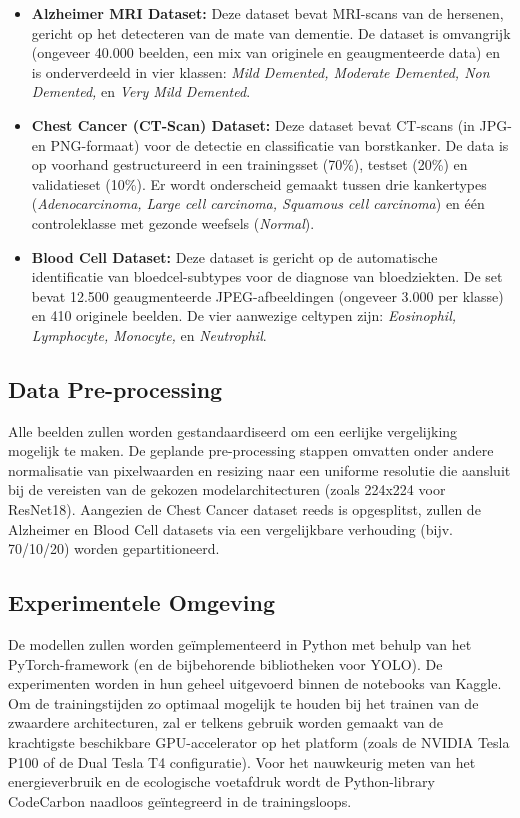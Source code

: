 \begin{itemize}
    \item \textbf{Alzheimer MRI Dataset:} Deze dataset bevat MRI-scans van de hersenen, gericht op het detecteren van de mate van dementie. De dataset is omvangrijk (ongeveer 40.000 beelden, een mix van originele en geaugmenteerde data) en is onderverdeeld in vier klassen: \textit{Mild Demented, Moderate Demented, Non Demented,} en \textit{Very Mild Demented}.
    
    \item \textbf{Chest Cancer (CT-Scan) Dataset:} Deze dataset bevat CT-scans (in JPG- en PNG-formaat) voor de detectie en classificatie van borstkanker. De data is op voorhand gestructureerd in een trainingsset (70\%), testset (20\%) en validatieset (10\%). Er wordt onderscheid gemaakt tussen drie kankertypes (\textit{Adenocarcinoma, Large cell carcinoma, Squamous cell carcinoma}) en één controleklasse met gezonde weefsels (\textit{Normal}).
    
    \item \textbf{Blood Cell Dataset:} Deze dataset is gericht op de automatische identificatie van bloedcel-subtypes voor de diagnose van bloedziekten. De set bevat 12.500 geaugmenteerde JPEG-afbeeldingen (ongeveer 3.000 per klasse) en 410 originele beelden. De vier aanwezige celtypen zijn: \textit{Eosinophil, Lymphocyte, Monocyte,} en \textit{Neutrophil}.
\end{itemize}

\subsection{Data Pre-processing}
Alle beelden zullen worden gestandaardiseerd om een eerlijke vergelijking mogelijk te maken. De geplande pre-processing stappen omvatten onder andere normalisatie van pixelwaarden en resizing naar een uniforme resolutie die aansluit bij de vereisten van de gekozen modelarchitecturen (zoals 224x224 voor ResNet18). Aangezien de Chest Cancer dataset reeds is opgesplitst, zullen de Alzheimer en Blood Cell datasets via een vergelijkbare verhouding (bijv. 70/10/20) worden gepartitioneerd.

\subsection{Experimentele Omgeving}
De modellen zullen worden geïmplementeerd in Python met behulp van het PyTorch-framework (en de bijbehorende bibliotheken voor YOLO). De experimenten worden in hun geheel uitgevoerd binnen de notebooks van Kaggle. Om de trainingstijden zo optimaal mogelijk te houden bij het trainen van de zwaardere architecturen, zal er telkens gebruik worden gemaakt van de krachtigste beschikbare GPU-accelerator op het platform (zoals de NVIDIA Tesla P100 of de Dual Tesla T4 configuratie). Voor het nauwkeurig meten van het energieverbruik en de ecologische voetafdruk wordt de Python-library CodeCarbon naadloos geïntegreerd in de trainingsloops.


